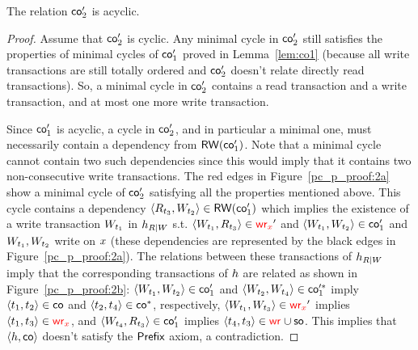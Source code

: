  
 \begin{lemma}\label{lem:co2}
 The relation $\co'_2$ is acyclic.
 \end{lemma}
 \begin{proof}
 Assume that $\co'_2$ is cyclic. Any minimal cycle in $\co'_2$ still satisfies the properties of minimal cycles of $\co'_1$ proved in Lemma~\ref{lem:co1} (because all write transactions are still totally ordered and $\co'_2$ doesn't relate directly read transactions). 
 So, a minimal cycle in $\co'_2$ contains a read transaction and a write transaction, and at most one more write transaction.
 
 Since $\co'_1$ is acyclic, a cycle in $\co'_2$, and in particular a minimal one, must  necessarily contain a dependency from $\rwo(\co'_1)$. Note that a minimal cycle cannot contain two such dependencies since this would imply that it contains two non-consecutive write transactions. 
% 
The red edges in Figure~\ref{pc_p_proof:2a} show a minimal cycle of $\co'_2$ satisfying all the properties mentioned above. This cycle contains a dependency $\tup{R_{\tr_3}, W_{\tr_2}}\in \rwo(\co'_1)$ which implies the existence of a write transaction $W_{\tr_1}$ in $\hist_{R|W}$ s.t. $\tup{W_{\tr_1}, R_{\tr_3}} \in \wro[\xvar]'$ and $\tup{W_{\tr_1}, W_{\tr_2}} \in \co'_1$ and $W_{\tr_1}, W_{\tr_2}$ write on $\xvar$ (these dependencies are represented by the black edges in Figure~\ref{pc_p_proof:2a}). The relations between these transactions of $\hist_{R|W}$ imply that the corresponding transactions of $\hist$ are related as shown in Figure~\ref{pc_p_proof:2b}: $\tup{W_{\tr_1}, W_{\tr_2}} \in \co'_1$ and $\tup{W_{\tr_2}, W_{\tr_4}} \in \co'^*_1$ imply $\tup{\tr_1, \tr_2} \in \co$ and $\tup{\tr_2, \tr_4} \in \co^*$, respectively, $\tup{W_{\tr_1}, W_{\tr_3}} \in \wro[\xvar]'$ implies $\tup{\tr_1, \tr_3} \in \wro[\xvar]$, and $\tup{W_{\tr_4}, R_{\tr_3}} \in \co'_1$ implies $\tup{\tr_4, \tr_3} \in \wro \cup \so$. This implies that $\tup{\hist,\co}$ doesn't satisfy the $\axpre$ axiom, a contradiction. %
\end{proof}
 
